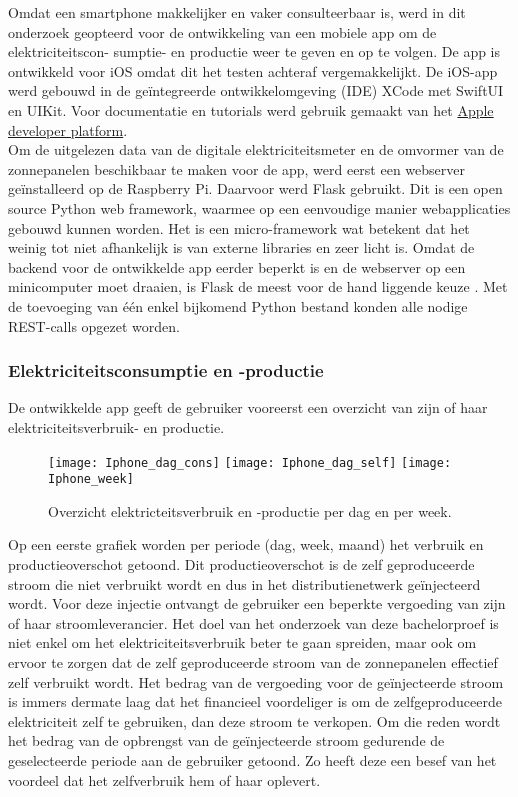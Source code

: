 Omdat een smartphone makkelijker en vaker consulteerbaar is, werd in dit onderzoek geopteerd voor de ontwikkeling van een mobiele app om de elektriciteitscon- sumptie- en productie weer te geven en op te volgen. De app is ontwikkeld voor iOS omdat dit het testen achteraf vergemakkelijkt. De iOS-app werd gebouwd in de geïntegreerde ontwikkelomgeving (IDE) XCode met SwiftUI en UIKit. Voor documentatie en tutorials werd gebruik gemaakt van het \href{https://developer.apple.com/}{Apple developer platform}. \\

Om de uitgelezen data van de digitale elektriciteitsmeter en de omvormer van de zonnepanelen beschikbaar te maken voor de app, werd eerst een webserver geïnstalleerd op de Raspberry Pi. Daarvoor werd Flask gebruikt. Dit is een open source Python web framework, waarmee op een eenvoudige manier webapplicaties gebouwd kunnen worden. Het is een micro-framework wat betekent dat het weinig tot niet afhankelijk is van externe libraries en zeer licht is. Omdat de backend voor de ontwikkelde app eerder beperkt is en de webserver op een minicomputer moet draaien, is Flask de meest voor de hand liggende keuze \autocite{Shokrzad2023}. Met de toevoeging van één enkel bijkomend Python bestand konden alle nodige REST-calls opgezet worden. 

\subsubsection{Elektriciteitsconsumptie en -productie}
De ontwikkelde app geeft de gebruiker vooreerst een overzicht van zijn of haar elektriciteitsverbruik- en productie. 

\begin{figure}[h!]
    \centering
    \texttt{[image: Iphone\_dag\_cons]} \hspace{0.1cm}
    \texttt{[image: Iphone\_dag\_self]} \hspace{0.1cm}
    \texttt{[image: Iphone\_week]}
    \caption{Overzicht elektricteitsverbruik en -productie per dag en per week.}
\end{figure}

Op een eerste grafiek worden per periode (dag, week, maand) het verbruik en productieoverschot getoond. Dit productieoverschot is de zelf geproduceerde stroom die niet verbruikt wordt en dus in het distributienetwerk geïnjecteerd wordt. Voor deze injectie ontvangt de gebruiker een beperkte vergoeding van zijn of haar stroomleverancier. Het doel van het onderzoek van deze bachelorproef is niet enkel om het elektriciteitsverbruik beter te gaan spreiden, maar ook om ervoor te zorgen dat de zelf geproduceerde stroom van de zonnepanelen effectief zelf verbruikt wordt. Het bedrag van de vergoeding voor de geïnjecteerde stroom is immers dermate laag dat het financieel voordeliger is om de zelfgeproduceerde elektriciteit zelf te gebruiken, dan deze stroom te verkopen. Om die reden wordt het bedrag van de opbrengst van de geïnjecteerde stroom gedurende de geselecteerde periode aan de gebruiker getoond. Zo heeft deze een besef van het voordeel dat het zelfverbruik hem of haar oplevert. \\

